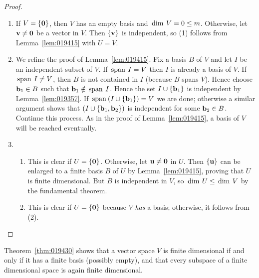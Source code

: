 \newpage
\begin{proof}
\begin{enumerate}
\item  If $V = \{\textbf{0}\}$, then $V$ has an empty basis and $\thinspace\operatorname{dim\medspace} V = 0 \leq m$. Otherwise, let $\textbf{v} \neq \textbf{0}$ be a vector in $V$. Then $\{\textbf{v}\}$ is independent, so (1) follows from Lemma~\ref{lem:019415} with $U = V$.

\item  We refine the proof of Lemma~\ref{lem:019415}. Fix a basis $B$ of $V$ and let $I$ be an independent subset of $V$. If $\thinspace\operatorname{span\medspace} I = V$ then $I$ is already a basis of $V$. If $\thinspace\operatorname{span\medspace} I \neq V$, then $B$ is not contained in $I$ (because $B$ spans $V$). Hence choose $\textbf{b}_{1} \in B$ such that $\textbf{b}_{1} \notin \thinspace\operatorname{span\medspace} I$. Hence the set $I \cup \{\textbf{b}_{1}\}$ is independent by Lemma~\ref{lem:019357}. If $\thinspace\operatorname{span\medspace}(I \cup \{\textbf{b}_{1}\}) = V$ we are done; otherwise a similar argument shows that $(I \cup \{\textbf{b}_{1}, \textbf{b}_{2}\})$ is independent for some $\textbf{b}_{2} \in B$. Continue this process. As in the proof of Lemma~\ref{lem:019415}, a basis of $V$ will be reached eventually.

\item
\begin{enumerate} [label={\alph*.}]
	\item This is clear if $U = \{\textbf{0}\}$. Otherwise, let $\textbf{u} \neq \textbf{0}$ in $U$. Then $\{\textbf{u}\}$ can be enlarged to a finite basis $B$ of $U$ by Lemma~\ref{lem:019415}, proving that $U$ is finite dimensional. But $B$ is independent in $V$, so $\thinspace\operatorname{dim\medspace} U \leq \thinspace\operatorname{dim\medspace} V$ by the fundamental theorem.

	\item  This is clear if $U = \{\textbf{0}\}$ because $V$ \textit{has} a basis; otherwise, it follows from (2).
\end{enumerate}
\end{enumerate}
\vspace*{-2em}\end{proof}

\noindent Theorem~\ref{thm:019430} shows that a vector space $V$ is finite dimensional if and only if it has a finite basis (possibly empty), and that every subspace of a finite dimensional space is again finite dimensional.

